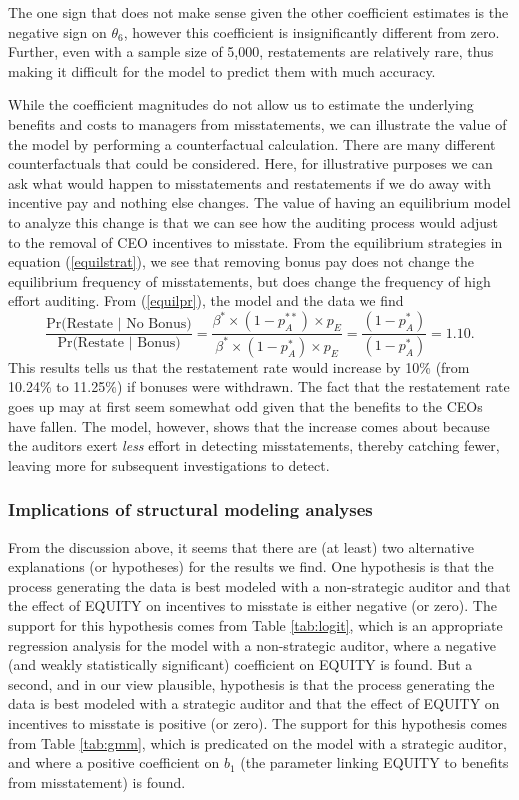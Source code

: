 The one sign that does not make sense given the other coefficient estimates is the negative sign on $\theta_6$, however this coefficient is insignificantly different from zero.
Further, even with a sample size of 5,000, restatements are relatively rare, thus making it difficult for the model to predict them with much accuracy. 

While the coefficient magnitudes do not allow us to estimate the underlying benefits and costs to managers from misstatements, we can illustrate the value of the model by performing a counterfactual calculation.
There are many different counterfactuals that could be considered. 
Here, for illustrative purposes we can ask what would happen to misstatements and restatements if we  do away with incentive pay and nothing else changes.
The value of having an equilibrium model to analyze this change is that we can see how the auditing process would adjust to the removal of CEO incentives to misstate. 
From the equilibrium strategies in equation (\ref{equilstrat}), we see that removing bonus pay does not change the equilibrium frequency of misstatements, but does change the frequency of high effort auditing.
From (\ref{equilpr}), the model and the data we find
$$ \dfrac{\mbox{Pr(Restate }\vert \mbox{ No Bonus)}}{\mbox{Pr(Restate }\vert \mbox{ Bonus)}}=\dfrac{\beta^* \times (1-p_A^{**}) \times p_{E}}
{\beta^* \times (1-p_A^{*}) \times p_{E}} = \dfrac{(1-p_A^*)}{(1-p_A^*)} = 1.10.$$
This results tells us that the restatement rate would increase by 10\% (from 10.24\% to 11.25\%) if bonuses were withdrawn. 
The fact that the restatement rate goes up may at first seem somewhat odd given that the benefits to the CEOs have fallen. 
The model, however, shows that the increase  comes about because the auditors exert \emph{less} effort in detecting misstatements, thereby catching fewer, leaving more for subsequent investigations to detect.

\subsubsection{Implications of structural modeling analyses}
From the discussion above, it seems that there are (at least) two alternative explanations (or hypotheses) for the results we find.
One hypothesis is that the process generating the data is best modeled with a non-strategic auditor and that the effect of EQUITY on incentives to misstate is either negative (or zero).
The support for this hypothesis comes from Table \ref{tab:logit}, which is an appropriate regression analysis for the model with a non-strategic auditor, where a negative (and weakly statistically significant) coefficient on EQUITY is found.
But a second, and in our view plausible, hypothesis is that the process generating the data is best modeled with a strategic auditor and that the effect of EQUITY on incentives to misstate is positive (or zero).
The support for this hypothesis comes from Table \ref{tab:gmm}, which is predicated on the model with a strategic auditor, and where a positive coefficient on $b_1$ (the parameter linking EQUITY to benefits from misstatement) is found.

